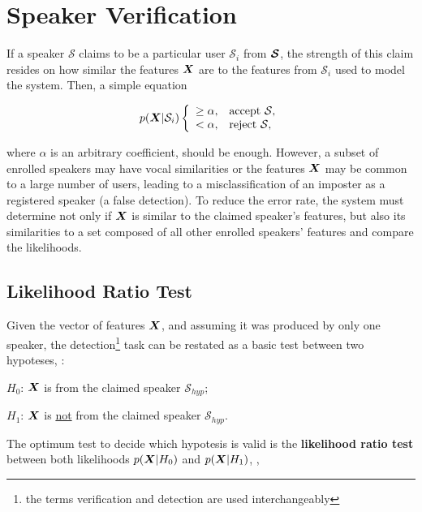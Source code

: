 \section{Speaker Verification}
\label{sec:speaker-verification}

If a speaker $\mathcal{S}$ claims to be a particular user $\mathcal{S}_i$ from $\boldsymbol{\mathcal{S}}$, the strength of this claim resides on how similar the features $\boldsymbol{X}$ are to the features from $\mathcal{S}_i$ used to model the system. Then, a simple equation

\begin{equation}
    \postpdf{\boldsymbol{X}}{\mathcal{S}_i} \verifytestB{\alpha}{\mathcal{S}}
    \label{eq:decision_speaker_verification}
\end{equation}

\noindent where $\alpha$ is an arbitrary coefficient, should be enough. However, a subset of enrolled speakers may have vocal similarities or the features $\boldsymbol{X}$ may be common to a large number of users, leading to a misclassification of an imposter as a registered speaker (a false detection). To reduce the error rate, the system must determine not only if $\boldsymbol{X}$ is similar to the claimed speaker's features, but also its similarities to a set composed of all other enrolled speakers' features and compare the likelihoods.

\subsection{Likelihood Ratio Test}

Given the vector of features $\boldsymbol{X}$, and assuming it was produced by only one speaker, the detection\footnote{the terms verification and detection are used interchangeably} task can be restated as a basic test between two hypoteses, :

\begin{description}\itemsep0pt
    \item $H_0$: $\boldsymbol{X}$ is from the claimed speaker $\mathcal{S}_{hyp}$;
    \item $H_1$: $\boldsymbol{X}$ is \underline{not} from the claimed speaker $\mathcal{S}_{hyp}$.
\end{description}

\noindent The optimum test to decide which hypotesis is valid is the \textbf{likelihood ratio test} between both likelihoods $p(\boldsymbol{X}|H_0)$ and $p(\boldsymbol{X}|H_1)$, ,

